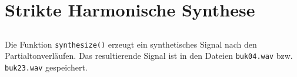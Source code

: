 \section{Strikte Harmonische Synthese}
\label{sec:2}

\subsection{}
Die Funktion \texttt{synthesize()} erzeugt ein synthetisches Signal nach den Partialtonverläufen.
Das resultierende Signal ist in den Dateien \texttt{buk04.wav} bzw. \texttt{buk23.wav} gespeichert.


\subsection{}

